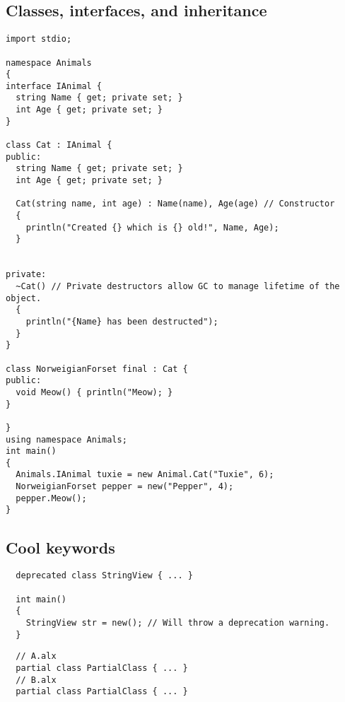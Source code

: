 \documentclass[border=1in]{standalone}
\begin{document}
\begin{minipage}{21cm}
\subsection*{Classes, interfaces, and inheritance}
\begin{lstlisting}
import stdio;

namespace Animals 
{
interface IAnimal {
  string Name { get; private set; }
  int Age { get; private set; }
}

class Cat : IAnimal {
public:
  string Name { get; private set; }
  int Age { get; private set; }

  Cat(string name, int age) : Name(name), Age(age) // Constructor
  {
    println("Created {} which is {} old!", Name, Age);
  }


private:
  ~Cat() // Private destructors allow GC to manage lifetime of the object.
  {
    println("{Name} has been destructed");
  }
}

class NorweigianForset final : Cat {
public:
  void Meow() { println("Meow); }
}

}
using namespace Animals;
int main() 
{
  Animals.IAnimal tuxie = new Animal.Cat("Tuxie", 6);
  NorweigianForset pepper = new("Pepper", 4);
  pepper.Meow();
}

\end{lstlisting}

\subsection*{Cool keywords}
\begin{lstlisting}
  deprecated class StringView { ... }

  int main()
  {
    StringView str = new(); // Will throw a deprecation warning.
  }
\end{lstlisting}

\begin{lstlisting}
  // A.alx
  partial class PartialClass { ... }
  // B.alx
  partial class PartialClass { ... }
\end{lstlisting}
\end{minipage}
\end{document}
